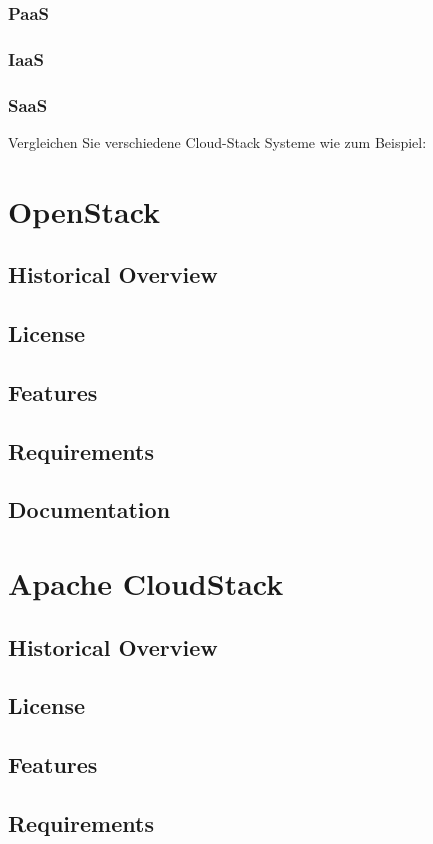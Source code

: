 \documentclass[12pt]{article}
\begin{document}
\subsubsection{PaaS}
\subsubsection{IaaS}
\subsubsection{SaaS}


Vergleichen Sie verschiedene Cloud-Stack Systeme wie zum Beispiel:
\section{OpenStack}
\subsection{Historical Overview}
\subsection{License}
\subsection{Features}
\subsection{Requirements}
\subsection{Documentation}
\section{Apache CloudStack}
\subsection{Historical Overview}
\subsection{License}
\subsection{Features}
\subsection{Requirements}
\end{document}
